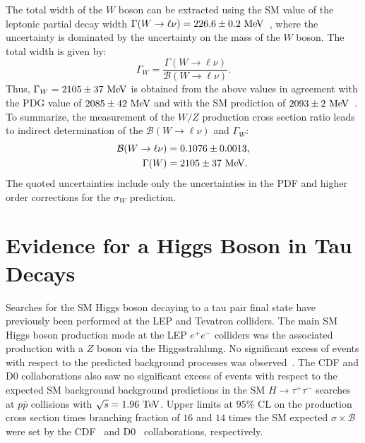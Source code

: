 The total width of the $W$ boson can be extracted using the SM value of the leptonic partial decay width $\Gamma(W \rightarrow \ell \nu)=226.6 \pm 0.2~\mathrm{Me\kern -0.1em V}$~\cite{Rosner:1993rj,Renton:2008ub}, where the uncertainty is dominated by the uncertainty on the mass of the $W$ boson. The total width is given by:
\begin{equation} \label{eq:xsec4}
\Gamma_W = \frac{\Gamma(W \rightarrow \ell \nu)}{\mathcal{B}(W \rightarrow \ell \nu) }.
\end{equation}
Thus, $\Gamma_W = 2105 \pm 37~\mathrm{Me\kern -0.1em V}$ is obtained from the above values in agreement with the PDG value of $2085 \pm 42~\mathrm{Me\kern -0.1em V}$ and with the SM prediction of $2093 \pm 2~\mathrm{Me\kern -0.1em V}$~\cite{Renton:2008ub}. To summarize, the measurement of the $W/Z$ production cross section ratio leads to indirect determination of the $\mathcal{B}(W\rightarrow \ell\nu)$  and $\Gamma_W$:
\begin{eqnarray} \label{eq:xsecm}
\begin{aligned}
\mathcal{B}(W\rightarrow \ell\nu) &= 0.1076 \pm 0.0013, \\
\Gamma(W) &= 2105 \pm 37~\mathrm{Me\kern -0.1em V}.
\end{aligned}
\end{eqnarray}
The quoted uncertainties include only the uncertainties in the PDF and higher order corrections for the $\sigma_W$ prediction. 
 

\section{Evidence for a Higgs Boson in Tau Decays}

Searches for the SM Higgs boson decaying to a tau pair final state have previously been performed at the LEP and Tevatron colliders. The main SM Higgs boson production mode at the LEP $e^{+}e^{-}$ colliders was the associated production with a $Z$ boson via the Higgsstrahlung. No significant excess of events with respect to the predicted background processes was observed~\cite{Barate:2000ts,Abbiendi:2000ac,Achard:2001pj,Abdallah:2003ip}. The CDF and D$0$ collaborations also saw no significant excess of events with respect to the expected SM background background predictions in the SM $H \rightarrow \tau^{+}\tau^{-}$ searches at $p\bar{p}$ collisions with $\sqrt{s}=1.96~\mathrm{Te\kern -0.1em V}$. Upper limits at $95\%$ CL on the production cross section times branching fraction of $16$ and $14$ times the SM expected $\sigma \times \mathcal{B}$ were set by the CDF~\cite{Aaltonen:2012jh} and D$0$~\cite{Abazov:2012zj} collaborations, respectively. 

